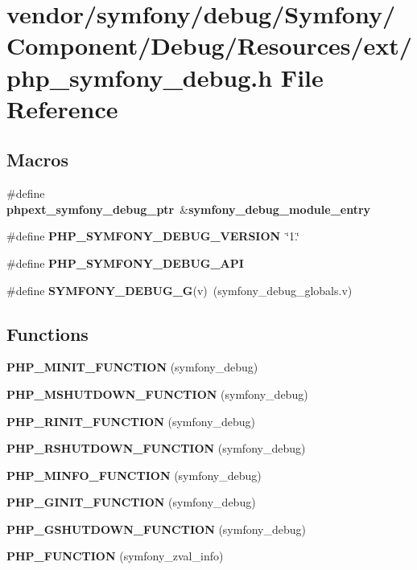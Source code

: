 \section{vendor/symfony/debug/\+Symfony/\+Component/\+Debug/\+Resources/ext/php\+\_\+symfony\+\_\+debug.h File Reference}
\label{php__symfony__debug_8h}
\subsection*{Macros}
\begin{DoxyCompactItemize}
\item 
\#define {\bf phpext\+\_\+symfony\+\_\+debug\+\_\+ptr}~\&{\bf symfony\+\_\+debug\+\_\+module\+\_\+entry}
\item 
\#define {\bf P\+H\+P\+\_\+\+S\+Y\+M\+F\+O\+N\+Y\+\_\+\+D\+E\+B\+U\+G\+\_\+\+V\+E\+R\+S\+I\+O\+N}~\char`\"{}1.\char`\"{}
\item 
\#define {\bf P\+H\+P\+\_\+\+S\+Y\+M\+F\+O\+N\+Y\+\_\+\+D\+E\+B\+U\+G\+\_\+\+A\+P\+I}
\item 
\#define {\bf S\+Y\+M\+F\+O\+N\+Y\+\_\+\+D\+E\+B\+U\+G\+\_\+\+G}(v)~(symfony\+\_\+debug\+\_\+globals.\+v)
\end{DoxyCompactItemize}
\subsection*{Functions}
\begin{DoxyCompactItemize}
\item 
{\bf P\+H\+P\+\_\+\+M\+I\+N\+I\+T\+\_\+\+F\+U\+N\+C\+T\+I\+O\+N} (symfony\+\_\+debug)
\item 
{\bf P\+H\+P\+\_\+\+M\+S\+H\+U\+T\+D\+O\+W\+N\+\_\+\+F\+U\+N\+C\+T\+I\+O\+N} (symfony\+\_\+debug)
\item 
{\bf P\+H\+P\+\_\+\+R\+I\+N\+I\+T\+\_\+\+F\+U\+N\+C\+T\+I\+O\+N} (symfony\+\_\+debug)
\item 
{\bf P\+H\+P\+\_\+\+R\+S\+H\+U\+T\+D\+O\+W\+N\+\_\+\+F\+U\+N\+C\+T\+I\+O\+N} (symfony\+\_\+debug)
\item 
{\bf P\+H\+P\+\_\+\+M\+I\+N\+F\+O\+\_\+\+F\+U\+N\+C\+T\+I\+O\+N} (symfony\+\_\+debug)
\item 
{\bf P\+H\+P\+\_\+\+G\+I\+N\+I\+T\+\_\+\+F\+U\+N\+C\+T\+I\+O\+N} (symfony\+\_\+debug)
\item 
{\bf P\+H\+P\+\_\+\+G\+S\+H\+U\+T\+D\+O\+W\+N\+\_\+\+F\+U\+N\+C\+T\+I\+O\+N} (symfony\+\_\+debug)
\item 
{\bf P\+H\+P\+\_\+\+F\+U\+N\+C\+T\+I\+O\+N} (symfony\+\_\+zval\+\_\+info)
\end{DoxyCompactItemize}
